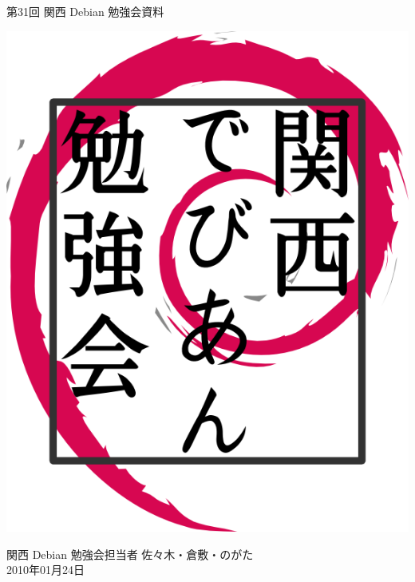 \documentclass[mingoth,a4paper]{jsarticle}
\newcommand{\debmtgyear}{2010}
\newcommand{\debmtgdate}{24}
\newcommand{\debmtgmonth}{01}
\newcommand{\debmtgnumber}{31}
\begin{document}
\begin{titlepage}


 第\debmtgnumber{}回 関西 Debian 勉強会資料

\vspace{2cm}

\begin{center}
\includegraphics{image200802/kansaidebianlogo.png}
\end{center}

\begin{flushright}
\hfill{}関西 Debian 勉強会担当者 佐々木・倉敷・のがた \\
\hfill{}\debmtgyear{}年\debmtgmonth{}月\debmtgdate{}日
\end{flushright}

\thispagestyle{empty}
\end{titlepage}


\subsection*{}%
 
\end{document}
